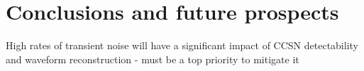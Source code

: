 \chapter{Conclusions and future prospects}

High rates of transient noise will have a significant impact of CCSN detectability and waveform reconstruction - must be a top priority to mitigate it 